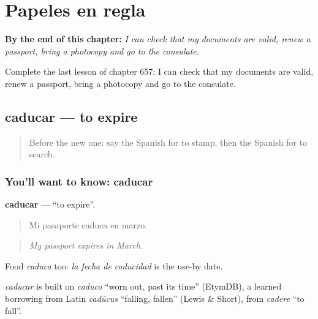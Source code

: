 
\chapter{Papeles en regla}
\label{ch:es-papeles-en-regla}

\begin{chapteropening}
\textbf{By the end of this chapter:} \emph{I can check that my documents are valid, renew a passport, bring a photocopy and go to the consulate.}

Complete the last lesson of chapter 657: I can check that my documents are valid, renew a passport, bring a photocopy and go to the consulate.
\end{chapteropening}

\section[caducar]{caducar — to expire}

\label{lesson:ES-C657-caducar}



\begin{quote}
Before the new one: say the Spanish for to stamp, then the Spanish for to search.
\end{quote}

\subsection*{You'll want to know: caducar}
\textbf{caducar} — \textquotedblleft{}to expire\textquotedblright{}.

\begin{quote}
Mi pasaporte caduca en marzo.
\end{quote}

\begin{quote}
\emph{My passport expires in March.}
\end{quote}

Food \emph{caduca} too: \emph{la fecha de caducidad} is the use-by date.

\begin{cousinweb}
\emph{caducar} is built on \emph{caduco} \textquotedblleft{}worn out, past its time\textquotedblright{} (EtymDB), a learned borrowing from Latin \emph{cadūcus} \textquotedblleft{}falling, fallen\textquotedblright{} (Lewis \& Short), from \emph{cadere} \textquotedblleft{}to fall\textquotedblright{}.
\end{cousinweb}

